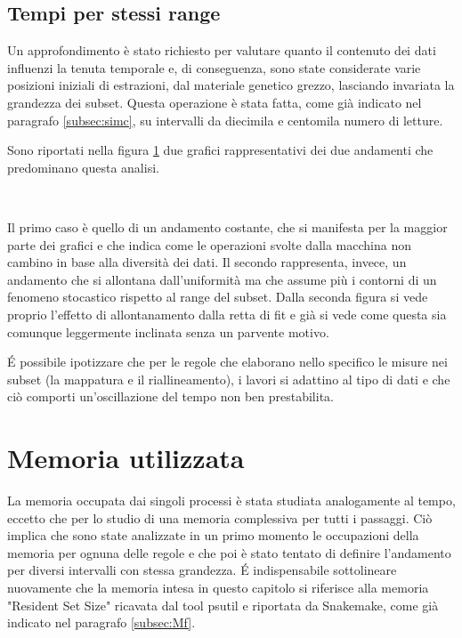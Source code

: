 \subsection{Tempi per stessi range}
Un approfondimento è stato richiesto per valutare quanto il contenuto dei dati influenzi la tenuta temporale e, di conseguenza, sono state considerate varie posizioni iniziali di estrazioni, dal materiale genetico grezzo, lasciando invariata la grandezza dei subset.
Questa operazione è stata fatta, come già indicato nel paragrafo \ref{subsec:simc}, su intervalli da diecimila e centomila numero di letture.

Sono riportati nella figura \ref{fig:Trng} due grafici rappresentativi dei due andamenti che predominano questa analisi.
\begin{figure}[H]
\centering
{} \quad
{} \\
\caption{}
\label{fig:Trng}
\end{figure}

Il primo caso è quello di un andamento costante, che si manifesta per la maggior parte dei grafici e che indica come le operazioni svolte dalla macchina non cambino in base alla diversità dei dati.
Il secondo rappresenta, invece, un andamento che si allontana dall'uniformità ma che assume più i contorni di un fenomeno stocastico rispetto al range del subset.
Dalla seconda figura si vede proprio l'effetto di allontanamento dalla retta di fit e già si vede come questa sia comunque leggermente inclinata senza un parvente motivo.

\'E possibile ipotizzare che per le regole che elaborano nello specifico le misure nei subset (la mappatura e il riallineamento), i lavori si adattino al tipo di dati e che ciò comporti un'oscillazione del tempo non ben prestabilita.

\section{Memoria utilizzata}
La memoria occupata dai singoli processi è stata studiata analogamente al tempo, eccetto che per lo studio di una memoria complessiva per tutti i passaggi. 
Ciò implica che sono state analizzate in un primo momento le occupazioni della memoria per ognuna delle regole e che poi è stato tentato di definire l'andamento per diversi intervalli con stessa grandezza.
\'E indispensabile sottolineare nuovamente che la memoria intesa in questo capitolo si riferisce alla memoria "Resident Set Size" ricavata dal tool psutil e riportata da Snakemake, come già indicato nel paragrafo \ref{subsec:Mf}. 

